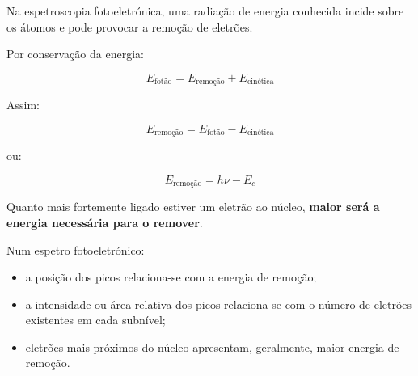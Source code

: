 \documentclass[11pt,a4paper]{article}
\begin{document}
	\begin{recorda}
		
		Na espetroscopia fotoeletrónica, uma radiação de energia conhecida incide
		sobre os átomos e pode provocar a remoção de eletrões.
		
		Por conservação da energia:
		
		\[
		E_{\text{fotão}}
		=
		E_{\text{remoção}}
		+
		E_{\text{cinética}}
		\]
		
		Assim:
		
		\[
		\boxed{
			E_{\text{remoção}}
			=
			E_{\text{fotão}}
			-
			E_{\text{cinética}}
		}
		\]
		
		ou:
		
		\[
		\boxed{
			E_{\text{remoção}}
			=
			h\nu-E_c
		}
		\]
		
		Quanto mais fortemente ligado estiver um eletrão ao núcleo,
		\textbf{maior será a energia necessária para o remover}.
		
		Num espetro fotoeletrónico:
		
		\begin{itemize}
			
			\item a posição dos picos relaciona-se com a energia de remoção;
			
			\item a intensidade ou área relativa dos picos relaciona-se com o número
			de eletrões existentes em cada subnível;
			
			\item eletrões mais próximos do núcleo apresentam, geralmente,
			maior energia de remoção.
			
		\end{itemize}
		
	\end{recorda}
	
	
\end{document}
